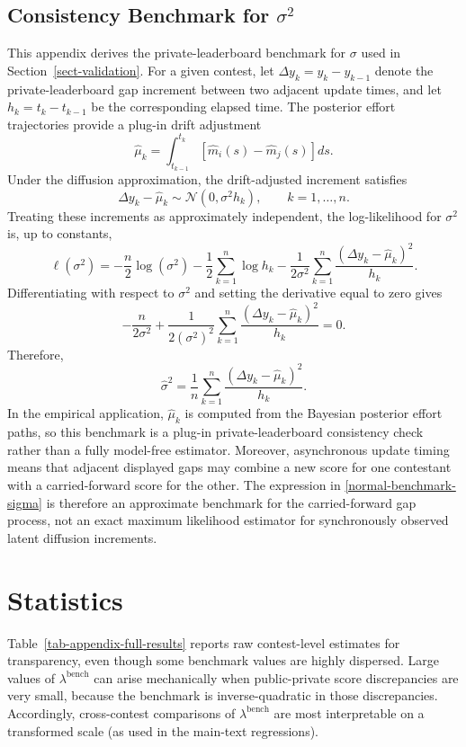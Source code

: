 \documentclass[mnsc]{informs3}
\begin{document}
\begin{APPENDICES}
\subsection{Consistency Benchmark for $\sigma^2$}\label{appexidx-normal-benchmark}

This appendix derives the private-leaderboard benchmark for $\sigma$ used in Section~\ref{sect-validation}.
For a given contest, let $\Delta y_k=y_k-y_{k-1}$ denote the private-leaderboard gap increment between two adjacent update times, and let $h_k=t_k-t_{k-1}$ be the corresponding elapsed time.
The posterior effort trajectories provide a plug-in drift adjustment
\[
\hat\mu_k=\int_{t_{k-1}}^{t_k}\left[\hat m_i(s)-\hat m_j(s)\right]ds.
\]
Under the diffusion approximation, the drift-adjusted increment satisfies
\[
\Delta y_k-\hat\mu_k\sim\mathcal N(0,\sigma^2 h_k),
\qquad k=1,\ldots,n.
\]
Treating these increments as approximately independent, the log-likelihood for $\sigma^2$ is, up to constants,
\[
\ell(\sigma^2)
=
-\frac{n}{2}\log(\sigma^2)
-\frac{1}{2}\sum_{k=1}^n\log h_k
-\frac{1}{2\sigma^2}\sum_{k=1}^n
\frac{(\Delta y_k-\hat\mu_k)^2}{h_k}.
\]
Differentiating with respect to $\sigma^2$ and setting the derivative equal to zero gives
\[
-\frac{n}{2\sigma^2}
+
\frac{1}{2(\sigma^2)^2}
\sum_{k=1}^n
\frac{(\Delta y_k-\hat\mu_k)^2}{h_k}
=0.
\]
Therefore,
\begin{equation}\label{normal-benchmark-sigma}
\hat{\sigma}^2
=
\frac{1}{n}\sum_{k=1}^n
\frac{(\Delta y_k-\hat\mu_k)^2}{h_k}.
\end{equation}
In the empirical application, $\hat\mu_k$ is computed from the Bayesian posterior effort paths, so this benchmark is a plug-in private-leaderboard consistency check rather than a fully model-free estimator. Moreover, asynchronous update timing means that adjacent displayed gaps may combine a new score for one contestant with a carried-forward score for the other. The expression in \eqref{normal-benchmark-sigma} is therefore an approximate benchmark for the carried-forward gap process, not an exact maximum likelihood estimator for synchronously observed latent diffusion increments.








\section{Statistics}\label{appendix-statistics}

Table~\ref{tab-appendix-full-results} reports raw contest-level estimates for transparency, even though some benchmark values are highly dispersed.
Large values of $\lambda^{\text{bench}}$ can arise mechanically when public-private score discrepancies are very small, because the benchmark is inverse-quadratic in those discrepancies.
Accordingly, cross-contest comparisons of $\lambda^{\text{bench}}$ are most interpretable on a transformed scale (as used in the main-text regressions).


\end{APPENDICES}
\end{document}

